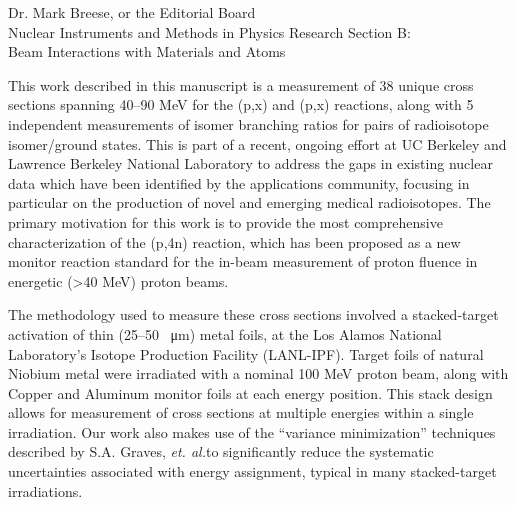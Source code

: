 \documentclass{letter} %
\begin{document}
\begin{letter}{Dr. Mark Breese, or the Editorial Board \\
Nuclear Instruments and Methods in Physics Research Section B: \\
Beam Interactions with Materials and Atoms}
 
\noindent This work described in this manuscript is a measurement of 38 unique cross sections spanning 40--90 MeV for the (p,x) and (p,x) reactions, along with 5 independent measurements of isomer branching ratios for pairs of radioisotope isomer/ground states. This is part of a recent, ongoing effort at UC Berkeley and Lawrence Berkeley National Laboratory to address the gaps in existing nuclear data which have been identified by the applications community, focusing in particular on the production of novel and emerging medical radioisotopes. The primary motivation for this work is to provide the most comprehensive characterization of the (p,4n) reaction, which has been proposed as a new monitor reaction standard for the in-beam measurement  of proton fluence in energetic (\textgreater 40 MeV) proton beams.

\noindent The methodology used to measure these cross sections involved a stacked-target activation of thin (25--50 \SI{}{\micro\meter}) metal foils,  at the Los Alamos National Laboratory's Isotope Production Facility (LANL-IPF). Target foils of natural Niobium metal were irradiated with a nominal 100 MeV proton beam, along with Copper and Aluminum monitor foils at each energy position.   This stack design allows for measurement of cross sections at multiple energies within a single irradiation. Our work also makes use of the ``variance minimization'' techniques described by S.A. Graves, \emph{et. al.}\footnotemark[7] to significantly reduce the systematic uncertainties associated with energy assignment, typical in many stacked-target irradiations.




\end{letter}
\end{document}

